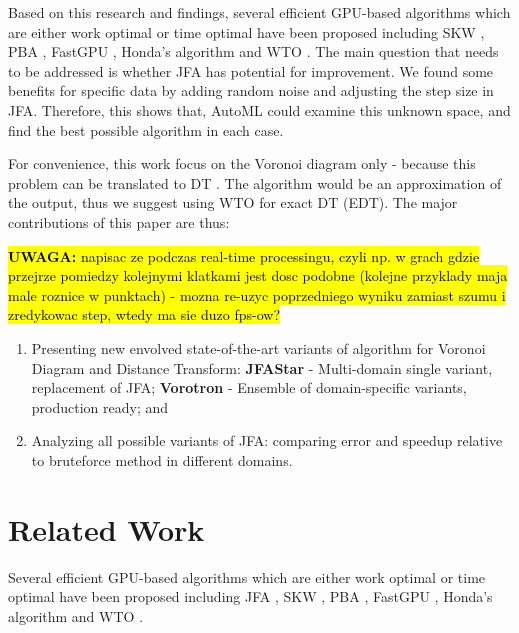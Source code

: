 \documentclass[format=acmsmall,screen,review,authordraft,nonacm]{acmart}
\newcommand{\ourjfasingle}{JFAStar}
\newcommand{\ourjfa}{Vorotron} %
\begin{document}
Based on this research and findings, several efficient GPU-based algorithms
which are either work optimal or time optimal have been proposed including SKW
\cite{schneider2009gpu}, PBA \cite{cao2010parallel}, FastGPU \cite{de2017fast},
Honda's algorithm \cite{honda2017simple} and WTO \cite{manduhu2019work}.
The main question that needs to be addressed is whether JFA has potential for
improvement. We found some benefits for specific data by adding random noise and
adjusting the step size in JFA. Therefore, this shows that, AutoML could
examine this unknown space, and find the best possible algorithm in each case.

For convenience, this work focus on the Voronoi diagram only - because this
problem can be translated to DT \cite{rong2006jump}.  The algorithm would be an
approximation of the output, thus we suggest using WTO \cite{manduhu2019work}
for exact DT (EDT). The major contributions of this paper are thus:

\hl{\textbf{UWAGA:} napisac ze podczas real-time processingu, czyli np. w grach
gdzie przejrze pomiedzy kolejnymi klatkami jest dosc podobne (kolejne przyklady
maja male roznice w punktach) - mozna re-uzyc poprzedniego wyniku zamiast szumu
i zredykowac step, wtedy ma sie duzo fps-ow?}

\begin{enumerate}
	\item Presenting new envolved state-of-the-art variants of algorithm for Voronoi
		Diagram and Distance Transform: %
		\textbf{\ourjfasingle} - Multi-domain single variant, replacement of JFA;
		\textbf{\ourjfa} - Ensemble of domain-specific variants, production ready; and
	\item Analyzing all possible variants of JFA: comparing error and speedup
		relative to bruteforce method in different domains.
\end{enumerate}

\section{Related Work} %

Several efficient GPU-based algorithms which are either work optimal or time
optimal have been proposed including JFA \cite{rong2006jump}, SKW
\cite{schneider2009gpu}, PBA \cite{cao2010parallel}, FastGPU \cite{de2017fast},
Honda's algorithm \cite{honda2017simple} and WTO \cite{manduhu2019work}.
\end{document}

